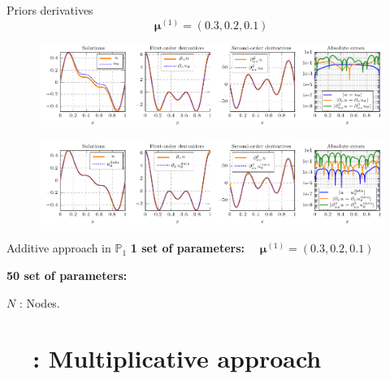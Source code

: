 \begin{frame}{Priors derivatives}
	\vspace{-10pt}
	$$\bm{\mu}^{(1)}=(0.3,0.2,0.1)$$
	\begin{figure}[ht!]
		\centering
		\includegraphics[width=\linewidth]{images/appendix/datavspinns/standalone_solutions_and_errors_PINN.pdf}
	\end{figure}
	
	\begin{figure}[ht!]
		\centering
		\includegraphics[width=\linewidth]{images/appendix/datavspinns/standalone_solutions_and_errors_NN.pdf}
	\end{figure}
\end{frame}

\begin{frame}{Additive approach in $\mathbb{P}_1$}
	\vspace{-2pt}
	\textbf{1 set of parameters:} $\quad \bm{\mu}^{(1)}=(0.3,0.2,0.1)$
	
	\begin{table}[H]
		\centering
	\end{table}

	\vspace{6pt}
	\textbf{50 set of parameters:}

	\begin{table}[H]
		\centering
	\end{table}

	\footnotesize
	$N$ : Nodes.
\end{frame}

\addtocounter{appendixframenumber}{1}

\section{\appendixname~\theappendixframenumber~: Multiplicative approach}

